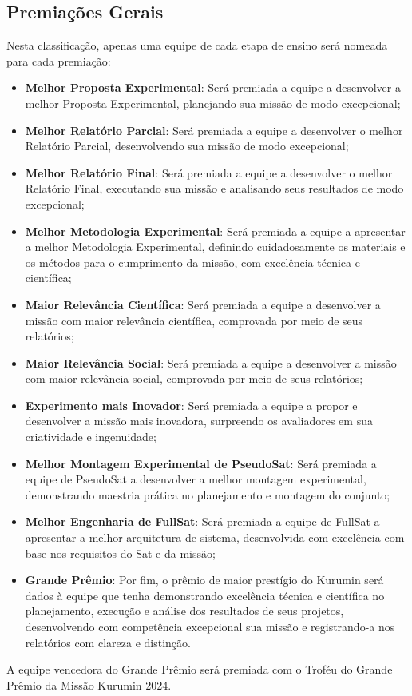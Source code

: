     \subsection{Premiações Gerais}
        Nesta classificação, apenas uma equipe de cada etapa de ensino será nomeada para cada premiação:
        \begin{itemize}
            \item \textbf{Melhor Proposta Experimental}: Será premiada a equipe a desenvolver a melhor Proposta Experimental, planejando sua missão de modo excepcional;
            \item \textbf{Melhor Relatório Parcial}: Será premiada a equipe a desenvolver o melhor Relatório Parcial, desenvolvendo sua missão de modo excepcional;
            \item \textbf{Melhor Relatório Final}: Será premiada a equipe a desenvolver o melhor Relatório Final, executando sua missão e analisando seus resultados de modo excepcional;
            \item \textbf{Melhor Metodologia Experimental}: Será premiada a equipe a apresentar a melhor Metodologia Experimental, definindo cuidadosamente os materiais e os métodos para o cumprimento da missão, com excelência técnica e científica;
            \item \textbf{Maior Relevância Científica}: Será premiada a equipe a desenvolver a missão com maior relevância científica, comprovada por meio de seus relatórios;
            \item \textbf{Maior Relevância Social}: Será premiada a equipe a desenvolver a missão com maior relevância social, comprovada por meio de seus relatórios;
            \item \textbf{Experimento mais Inovador}: Será premiada a equipe a propor e desenvolver a missão mais inovadora, surpreendo os avaliadores em sua criatividade e ingenuidade;
            \item \textbf{Melhor Montagem Experimental de PseudoSat}: Será premiada a equipe de PseudoSat a desenvolver a melhor montagem experimental, demonstrando maestria prática no planejamento e montagem do conjunto;  
            \item \textbf{Melhor Engenharia de FullSat}: Será premiada a equipe de FullSat a apresentar a melhor arquitetura de sistema, desenvolvida com excelência com base nos requisitos do Sat e da missão;
            \item \textbf{Grande Prêmio}: Por fim, o prêmio de maior prestígio do Kurumin será dados à equipe que tenha demonstrando excelência técnica e científica no planejamento, execução e análise dos resultados de seus projetos, desenvolvendo com competência excepcional sua missão e registrando-a nos relatórios com clareza e distinção.
        \end{itemize}
        
        A equipe vencedora do Grande Prêmio será premiada com o Troféu do Grande Prêmio da Missão Kurumin 2024.